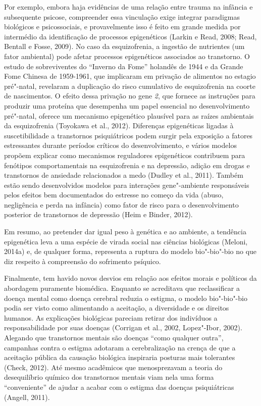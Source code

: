 Por exemplo, embora haja evidências de uma relação entre trauma na
infância e subsequente psicose, compreender essa vinculação exige
integrar paradigmas biológicos e psicossociais, e provavelmente isso é
feito em grande medida por intermédio da identificação de processos
epigenéticos (Larkin e Read, 2008; Read, Bentall e Fosse, 2009). No caso
da esquizofrenia, a ingestão de nutrientes (um fator ambiental) pode
afetar processos epigenéticos associados ao transtorno. O estudo de
sobreviventes do ``Inverno da Fome'' holandês de 1944 e da Grande Fome
Chinesa de 1959-1961, que implicaram em privação de alimentos no estagio
pré"-natal, revelaram a duplicação do risco cumulativo de esquizofrenia
na coorte de nascimentos. O efeito dessa privação no gene \emph{2},
que fornece as instruções para produzir uma proteína que desempenha um
papel essencial no desenvolvimento pré"-natal, oferece um mecanismo
epigenético plausível para as raízes ambientais da esquizofrenia
(Toyokawa et al., 2012). Diferenças epigenéticas ligadas à
suscetibilidade a transtornos psiquiátricos podem surgir pela exposição
a fatores estressantes durante períodos críticos do desenvolvimento, e
vários modelos propõem explicar como mecanismos reguladores epigenéticos
contribuem para fenótipos comportamentais na esquizofrenia e na
depressão, adição em drogas e transtornos de ansiedade relacionados a
medo (Dudley et al., 2011). Também estão sendo desenvolvidos modelos
para interações gene"-ambiente responsáveis pelos efeitos bem
documentados do estresse no começo da vida (abuso, negligência e perda
na infância) como fator de risco para o desenvolvimento posterior de
transtornos de depressão (Heim e Binder, 2012).

Em resumo, ao pretender dar igual peso à genética e ao ambiente, a
tendência epigenética leva a uma espécie de virada social nas ciências
biológicas (Meloni, 2014a) e, de qualquer forma, representa a ruptura do
modelo bio"-bio"-bio no que diz respeito à compreensão do sofrimento
psíquico.

Finalmente, tem havido novos desvios em relação aos efeitos morais e
políticos da abordagem puramente biomédica. Enquanto se acreditava que
reclassificar a doença mental como doença cerebral reduzia o estigma, o
modelo bio"-bio"-bio podia ser visto como alimentando a aceitação, a
diversidade e os direitos humanos. As explicações biológicas pareciam
retirar dos indivíduos a responsabilidade por suas doenças (Corrigan et
al., 2002, Lopez"-Ibor, 2002). Alegando que transtornos mentais são
doenças ``como qualquer outra'', campanhas contra o estigma adotaram a
cerebralização na crença de que a aceitação pública da causação
biológica inspiraria posturas mais tolerantes (Check, 2012). Até mesmo
acadêmicos que menosprezavam a teoria do desequilíbrio químico dos
transtornos mentais viam nela uma forma ``conveniente'' de ajudar a
acabar com o estigma das doenças psiquiátricas (Angell, 2011).

